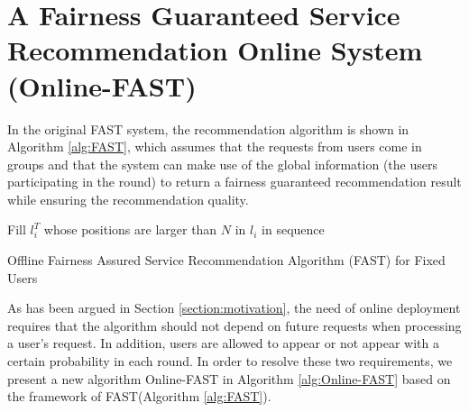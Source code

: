 \section{A Fairness Guaranteed Service Recommendation Online System (Online-FAST)}

In the original FAST system, the recommendation algorithm is shown in Algorithm \ref{alg:FAST}, which assumes that the requests from users come in groups and that the system can make use of the global information (the users participating in the round) to return a fairness guaranteed recommendation result while ensuring the recommendation quality.

\begin{algorithm}[htbp]
    \BlankLine
    
    Fill $l_{i}^{T}$ whose positions are larger than $N$ in $l_{i}$ in sequence \;
    \caption{Offline Fairness Assured Service Recommendation Algorithm (FAST) for Fixed Users \label{alg:FAST}}
\end{algorithm}

As has been argued in Section \ref{section:motivation}, the need of online deployment requires that the algorithm should not depend on future requests when processing a user's request. In addition, users are allowed to appear or not appear with a certain probability in each round. In order to resolve these two requirements, we present a new algorithm Online-FAST in Algorithm \ref{alg:Online-FAST} based on the framework of FAST(Algorithm \ref{alg:FAST}).

